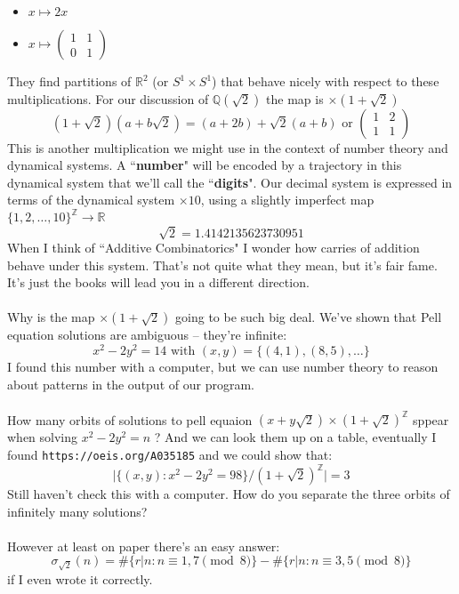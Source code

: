 \documentclass[12pt]{article}
\begin{document}
\begin{itemize}
\item $x \mapsto 2x$
\item $x \mapsto \left(\begin{array}{cc} 1 & 1 \\ 0 & 1 \end{array}\right) $
\end{itemize}
They find partitions of $\mathbb{R}^2$ (or $S^1 \times S^1$) that behave nicely with respect to these multiplications.  For our discussion of $\mathbb{Q}(\sqrt{2})$ the map is $ \times (1 + \sqrt{2})$
$$ (1 + \sqrt{2})(a + b \sqrt{2}) = (a + 2b) + \sqrt{2}(a+b) \text{ or }
\left(\begin{array}{cc} 1 & 2 \\ 1 & 1 \end{array}\right) $$
This is another multiplication we might use in the context of number theory and dynamical systems. A ``\textbf{number}" will be encoded by a trajectory in this dynamical system that we'll call the ``\textbf{digits}".  Our decimal system is expressed in terms of the dynamical system $\times 10$, using a slightly imperfect map $\{ 1, 2, \dots , 10\}^\mathbb{Z} \to \mathbb{R}$ 
$$ \sqrt{2} = 1.4142135623730951 $$
When I think of ``Additive Combinatorics" I wonder how carries of addition behave under this system.  That's not quite what they mean, but it's fair fame.  It's just the books will lead you in a different direction. \\ \\
Why is the map $\times (1 + \sqrt{2})$ going to be such big deal. We've shown that Pell equation solutions are ambiguous -- they're infinite:
$$ x^2 - 2 y^2 = 14 \text{ with } (x,y) = \{(4,1), (8,5), \dots \}  $$
I found this number with a computer, but we can use number theory to reason about patterns in the output of our program. \\ \\
How many orbits of solutions to pell equaion $(x + y \sqrt{2})\times (1 + \sqrt{2})^\mathbb{Z}$ sppear when solving $x^2 - 2y^2 = n$  ? And we can look them up on a table, eventually I found \texttt{https://oeis.org/A035185} and we could show that:
$$ \Big|  \big\{ (x,y): x^2 - 2y^2 = 98 \big\} \big/ (1 + \sqrt{2})^\mathbb{Z} \Big| = 3 $$
Still haven't check this with a computer.  How do you separate the three orbits of infinitely many solutions? \\ \\
However at least on paper there's an easy answer:
$$ \sigma_{\sqrt{2}}(n) = \#\big\{ r | n : n \equiv 1,7 \pmod 8 \big\} - \#\big\{ r | n : n \equiv 3,5 \pmod 8 \big\} $$
if I even wrote it correctly.
\end{document}
